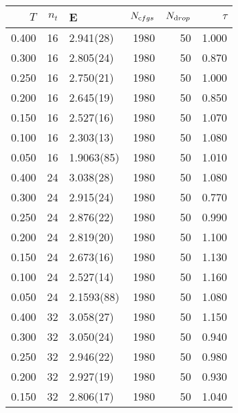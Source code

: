 \begin{tabular}{rrlrrr}
\hline
   $T$ &   $n_t$ & E          &   $N_{\textrm cfgs}$ &   $N_{\textrm drop}$ &   $\tau$ \\
\hline
 0.400 &      16 & 2.941(28)  &                 1980 &                   50 &    1.000 \\
 0.300 &      16 & 2.805(24)  &                 1980 &                   50 &    0.870 \\
 0.250 &      16 & 2.750(21)  &                 1980 &                   50 &    1.000 \\
 0.200 &      16 & 2.645(19)  &                 1980 &                   50 &    0.850 \\
 0.150 &      16 & 2.527(16)  &                 1980 &                   50 &    1.070 \\
 0.100 &      16 & 2.303(13)  &                 1980 &                   50 &    1.080 \\
 0.050 &      16 & 1.9063(85) &                 1980 &                   50 &    1.010 \\
 0.400 &      24 & 3.038(28)  &                 1980 &                   50 &    1.080 \\
 0.300 &      24 & 2.915(24)  &                 1980 &                   50 &    0.770 \\
 0.250 &      24 & 2.876(22)  &                 1980 &                   50 &    0.990 \\
 0.200 &      24 & 2.819(20)  &                 1980 &                   50 &    1.100 \\
 0.150 &      24 & 2.673(16)  &                 1980 &                   50 &    1.130 \\
 0.100 &      24 & 2.527(14)  &                 1980 &                   50 &    1.160 \\
 0.050 &      24 & 2.1593(88) &                 1980 &                   50 &    1.080 \\
 0.400 &      32 & 3.058(27)  &                 1980 &                   50 &    1.150 \\
 0.300 &      32 & 3.050(24)  &                 1980 &                   50 &    0.940 \\
 0.250 &      32 & 2.946(22)  &                 1980 &                   50 &    0.980 \\
 0.200 &      32 & 2.927(19)  &                 1980 &                   50 &    0.930 \\
 0.150 &      32 & 2.806(17)  &                 1980 &                   50 &    1.040 \\

\end{tabular}
